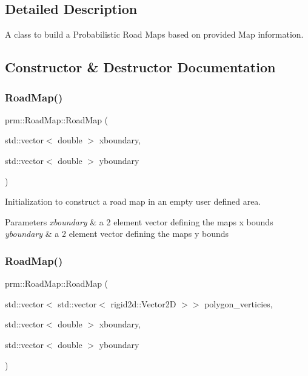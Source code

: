 \subsection{Detailed Description}
A class to build a Probabilistic Road Maps based on provided Map information. 

\subsection{Constructor \& Destructor Documentation}
\mbox{\label{classprm_1_1RoadMap_a95a183725f0ee0f2b0ce2643aa1ed870}} 
\subsubsection{\texorpdfstring{Road\+Map()}{RoadMap()}\hspace{0.1cm}{\footnotesize\ttfamily [1/2]}}
{\footnotesize\ttfamily prm\+::\+Road\+Map\+::\+Road\+Map (\begin{DoxyParamCaption}\item[{std\+::vector$<$ double $>$}]{xboundary,  }\item[{std\+::vector$<$ double $>$}]{yboundary }\end{DoxyParamCaption})}



Initialization to construct a road map in an empty user defined area. 


\begin{DoxyParams}{Parameters}
{\em xboundary} & a 2 element vector defining the map\textquotesingle{}s x bounds \\
\hline
{\em yboundary} & a 2 element vector defining the map\textquotesingle{}s y bounds \\
\hline
\end{DoxyParams}
\mbox{\label{classprm_1_1RoadMap_a1c44e6fa58b91b3b79bcf56e414dff44}} 
\subsubsection{\texorpdfstring{Road\+Map()}{RoadMap()}\hspace{0.1cm}{\footnotesize\ttfamily [2/2]}}
{\footnotesize\ttfamily prm\+::\+Road\+Map\+::\+Road\+Map (\begin{DoxyParamCaption}\item[{std\+::vector$<$ std\+::vector$<$ rigid2d\+::\+Vector2D $>$$>$}]{polygon\+\_\+verticies,  }\item[{std\+::vector$<$ double $>$}]{xboundary,  }\item[{std\+::vector$<$ double $>$}]{yboundary }\end{DoxyParamCaption})}



